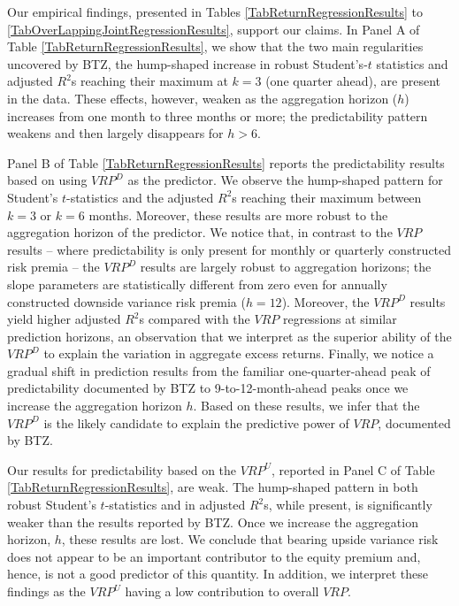 \documentclass[11pt]{article}
\begin{document}
Our empirical findings, presented in Tables \ref{TabReturnRegressionResults} to \ref{TabOverLappingJointRegressionResults}, support our claims. In Panel A of Table \ref{TabReturnRegressionResults}, we show that the two main regularities uncovered by BTZ, the hump-shaped increase in robust Student's-$t$ statistics and adjusted $R^2$s reaching their maximum at $k=3$ (one quarter ahead), are present in the data.
These effects, however, weaken as the aggregation horizon ($h$) increases from one month to three months or more; the predictability pattern weakens and then largely disappears for $h>6$.

Panel B of Table \ref{TabReturnRegressionResults} reports the predictability results based on using $VRP^{D}$ as the predictor.
We observe the hump-shaped pattern for Student's $t$-statistics and the adjusted $R^2$s reaching their maximum between $k=3$ or $k=6$ months. Moreover, these results are more robust to the aggregation horizon of the predictor. We notice that, in contrast to the $VRP$ results -- where predictability is only present for monthly or quarterly constructed risk premia -- the $VRP^{D}$ results are largely robust to aggregation horizons; the slope parameters are statistically different from zero even for annually constructed downside variance risk premia ($h=12$). Moreover, the $VRP^{D}$ results yield higher adjusted $R^2$s compared with the $VRP$ regressions at similar prediction horizons, an observation that we interpret as the superior ability of the $VRP^D$ to explain the variation in aggregate excess returns. Finally, we notice a gradual shift in prediction results from the familiar one-quarter-ahead peak of predictability documented by BTZ to 9-to-12-month-ahead peaks once we increase the aggregation horizon $h$. Based on these results, we infer that the $VRP^{D}$ is the likely candidate to explain the predictive power of $VRP$, documented by BTZ.

Our results for predictability based on the $VRP^{U}$, reported in Panel C of Table \ref{TabReturnRegressionResults},
are weak. The hump-shaped pattern in both robust Student's $t$-statistics and in adjusted $R^2$s, while present, is significantly weaker than the results reported by BTZ. Once we increase the aggregation horizon, $h$, these results are lost. We conclude that bearing upside variance risk does not appear to be an important contributor to the equity premium and,  hence, is not a good predictor of this quantity. In addition, we interpret these findings as the $VRP^{U}$ having a low contribution to overall $VRP$.
\end{document}

